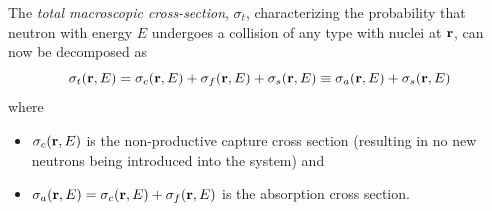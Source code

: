The \textit{total macroscopic cross-section}, $\sigma_t$, characterizing the probability
that neutron with energy $E$ undergoes a collision of any type with nuclei at $\mathbf{r}$, can now be decomposed as 
\begin{equation}\label{eq:st}
  \sigma_t(\mathbf{r},E) = \sigma_c(\mathbf{r},E) + \sigma_f(\mathbf{r},E) + \sigma_s(\mathbf{r},E) \equiv \sigma_a(\mathbf{r},E) + \sigma_s(\mathbf{r},E)
\end{equation}
where
\begin{itemize}
	\item $\sigma_c(\mathbf{r}, E)$ is the non-productive capture cross section (resulting in no new neutrons being introduced
	into the system) and
  	\item $\sigma_a(\mathbf{r}, E) = \sigma_c(\mathbf{r},E) + \sigma_f(\mathbf{r},E)$ is the absorption cross section.
\end{itemize}

